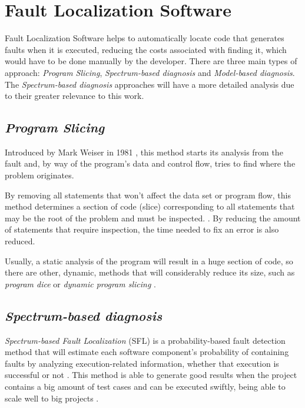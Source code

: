 \section{Fault Localization Software}

Fault Localization Software helps to automatically locate code that generates faults when it is executed, reducing the costs associated with finding it, which would have to be done manually by the developer.  There are three main types of approach: \emph{Program Slicing}, \emph{Spectrum-based diagnosis} and \emph{Model-based diagnosis}. The \emph{Spectrum-based diagnosis} approaches will have a more detailed analysis due to their greater relevance to this work.

% 
%

\subsection{\emph{Program Slicing}}

Introduced by Mark Weiser in 1981 \cite{Weiser1981, Weiser1982}, this method starts its analysis from the fault and, by way of the program's data and control flow, tries to find where the problem originates. 

By removing all statements that won't affect the data set or program flow, this method determines a section of code (slice) corresponding to all statements that may be the root of the problem and must be inspected. \cite{Perez2004}. By reducing the amount of statements that require inspection, the time needed to fix an error is also reduced.

Usually, a static analysis of the program will result in a huge section of code, so there are other, dynamic, methods that will considerably reduce its size, such as \emph{program dice} or \emph{dynamic program slicing} \cite{Perez2004}.

% 
%

\subsection{\emph{Spectrum-based diagnosis}}

\emph{Spectrum-based Fault Localization} (SFL) is a probability-based fault detection method that will estimate each software component's probability of containing faults by analyzing execution-related information, whether that execution is successful or not \cite{Abreu2007}. This method is able to generate good results when the project contains a big amount of test cases and can be executed swiftly, being able to scale well to big projects \cite{Mayer2008}.

